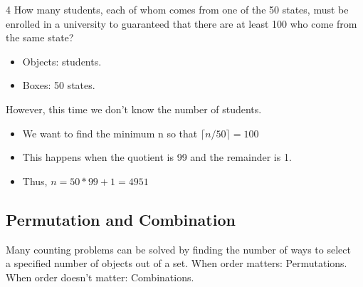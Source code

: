 \documentclass[12pt, letterpaper]{article}
\newcommand{\exheader}[1][ex]{{\tiny{#1}\normalsize}}
\newcommand{\ceil}[1]{\lceil {#1} \rceil}
\begin{document}
\exheader[4] How many students, each of whom comes from one of the 50 states, must be enrolled in a university to guaranteed that there are at least 100 who come from the same state?
\begin{itemize}[leftmargin=*, label={}]
	\item Objects: students.
	\item Boxes: 50 states.
\end{itemize}
However, this time we don't know the number of students.
\begin{itemize}[label={\faAngleRight}]
	\item We want to find the minimum n so that $\ceil{n/50} = 100$
	\item This happens when the quotient is 99 and the remainder is 1.
	\item Thus, $ n = 50 * 99 + 1 = 4951$
\end{itemize}

\pagebreak

\subsection{Permutation and Combination}
\begin{minipage}[t]{0.9\linewidth}
	Many counting problems can be solved by finding the number of ways to select \\ a specified number of objects out of a set. \smallbreak
	When order matters: Permutations. \\
	When order doesn't matter: Combinations. \smallbreak
\end{minipage}
\end{document}
